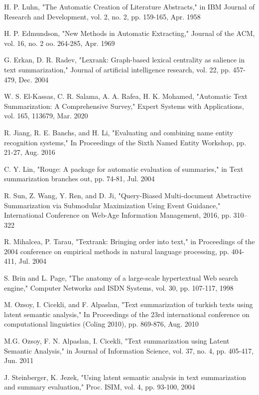 \documentclass[conference]{IEEEtran}
\begin{document}
\begin{thebibliography}{00}
 H. P. Luhn, "The Automatic Creation of Literature Abstracts," in IBM Journal of Research and Development, vol. 2, no. 2, pp. 159-165, Apr. 1958

 H. P. Edmundson, "New Methods in Automatic Extracting," Journal of the ACM, vol. 16, no. 2 oo. 264-285, Apr. 1969

 G. Erkan, D. R. Radev, "Lexrank: Graph-based lexical centrality as salience in text summarization," Journal of artificial intelligence research, vol. 22, pp. 457-479, Dec. 2004

 W. S. El-Kassas, C. R. Salama, A. A. Rafea, H. K. Mohamed, "Automatic Text Summarization: A Comprehensive Survey," Expert Systems with Applications, vol. 165, 113679, Mar. 2020

 R. Jiang, R. E. Banchs, and H. Li, "Evaluating and combining name entity recognition systems," In Proceedings of the Sixth Named Entity Workshop, pp. 21-27, Aug. 2016

 C. Y. Lin, "Rouge: A package for automatic evaluation of summaries," in Text summarization branches out, pp. 74-81, Jul. 2004

 R. Sun, Z. Wang, Y. Ren, and D. Ji, "Query-Biased Multi-document Abstractive Summarization via Submodular Maximization Using Event Guidance," International Conference on Web-Age Information Management, 2016, pp. 310–322

 R. Mihalcea, P. Tarau, "Textrank: Bringing order into text," in Proceedings of the 2004 conference on empirical methods in natural language processing, pp. 404-411, Jul. 2004

 S. Brin and L. Page, "The anatomy of a large-scale hypertextual Web search engine," Computer Networks and ISDN
Systems, vol. 30, pp. 107-117, 1998

 M. Ozsoy, I. Cicekli, and F. Alpaslan, "Text summarization of turkish texts using latent semantic analysis," In Proceedings of the 23rd international conference on computational linguistics (Coling 2010), pp. 869-876, Aug. 2010

 M.G. Ozsoy, F. N. Alpaslan, I. Cicekli, "Text summarization using Latent Semantic Analysis," in Journal of Information Science, vol. 37, no. 4, pp. 405-417, Jun. 2011

 J. Steinberger, K. Jezek, "Using latent semantic analysis in text summarization and summary evaluation," Proc. ISIM, vol. 4, pp. 93-100, 2004


\end{thebibliography}
\end{document}
